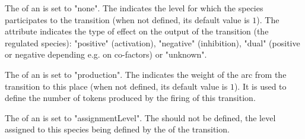 \medskip
\LRG The  of an  is set to "none". The  indicates the level for which the species participates to the transition (when not defined, its default value is $1$). The  attribute  indicates the type of effect on the output of the transition (the regulated species): "positive" (activation), "negative" (inhibition), "dual" (positive or negative depending e.g. on co-factors) or "unknown".

\medskip
\PN  The  of an  is set to "production". The  indicates the weight of the arc from the transition to this place  (when not defined, its default value is $1$). It is used to define the number of tokens produced by the firing of this transition.

\medskip
\LRG The  of an  is set to "assignmentLevel". The  should not be defined, the level assigned to this species being defined by the  of the transition.







